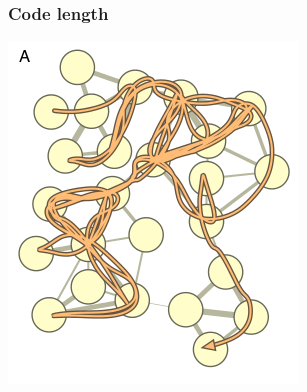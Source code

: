 \documentclass{beamer}
\begin{document}
\begin{frame}
  \frametitle{Code length}
  \begin{center}
    \includegraphics[height=0.8\textheight,width=\textwidth,keepaspectratio=true]{figure/map1}

    \tiny{}
  \end{center}
\end{frame}
\end{document}
